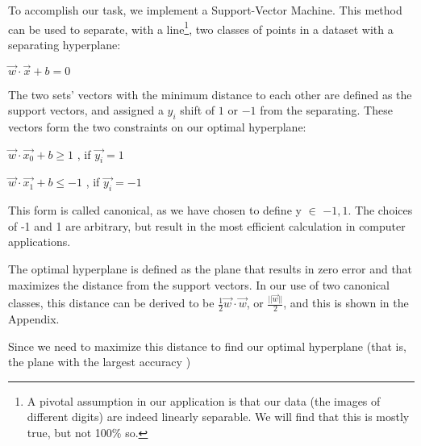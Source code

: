 %
%

To accomplish our task, we implement a Support-Vector Machine. This method can be used to separate, with a line\footnote{A pivotal assumption in our application is that our data (the images of different digits) are indeed linearly separable. We will find that this is mostly true, but not 100\% so.}, two classes of points in a dataset with a separating hyperplane:
\begin{center}
$\vec{w}\cdot\vec{x} + b = 0$\end{center}
The two sets' vectors with the minimum distance to each other are defined as the support vectors, and assigned a $y_{i}$ shift of $1$ or $-1$ from the separating. These vectors form the two constraints on our optimal hyperplane:
\begin{center}
$\vec{w}\cdot\vec{x_0} + b \geq 1 $ , if $  \vec{y_i} = 1$

$\vec{w}\cdot\vec{x_1} + b \leq -1 $ , if $  \vec{y_i} = -1$
\end{center}
This form is called canonical, as we have chosen to define y $\in$ ${-1, 1}$. The choices of -1 and 1 are arbitrary, but result in the most efficient calculation in computer applications.

The optimal hyperplane is defined as the plane that results in zero error and that maximizes the distance from the support vectors. In our use of two canonical classes, this distance can be derived to be $\frac{1}{2}\vec{w}\cdot\vec{w}$, or $\frac{||\vec{w}||}{2}$, and this is shown in the Appendix.

Since we need to maximize this distance to find our optimal hyperplane (that is, the plane with the largest accuracy )